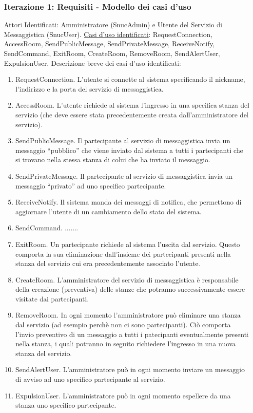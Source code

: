 \documentclass[t]{beamer} %
\let\olditem=\item%
\renewcommand{\item}{\olditem \justifying}%
\begin{document}
\begin{frame} [allowframebreaks]
  \frametitle{Iterazione 1: Requisiti - Modello dei casi d'uso}
   \underline{Attori Identificati}: Amministratore (SnucAdmin) e Utente del Servizio di Messaggistica (SnucUser). \newline
   \underline{Casi d'uso identificati}: RequestConnection, AccessRoom, SendPublicMessage, SendPrivateMessage, ReceiveNotify, SendCommand, ExitRoom, CreateRoom, 
                                        RemoveRoom, SendAlertUser, ExpulsionUser. \newline
   Descrizione breve dei casi d'uso identificati:
   \begin{enumerate} 
    \item RequestConnection. L’utente si connette al sistema specificando il nickname, l’indirizzo e la porta del servizio di messaggistica.
    \item AccessRoom. L’utente richiede al sistema l’ingresso in una specifica stanza del servizio (che deve essere stata precedentemente creata dall’amministratore 
          del servizio). 
    \item SendPublicMessage. Il partecipante al servizio di messaggistica invia un messaggio ``pubblico'' che viene inviato dal sistema a tutti i partecipanti che 
          si trovano nella stessa stanza di colui che ha inviato il messaggio.
    \item SendPrivateMessage. Il partecipante al servizio di messaggistica  invia un messaggio ``privato'' ad uno specifico partecipante.
    \item ReceiveNotify. Il sistema manda dei messaggi di notifica, che permettono di aggiornare l’utente di un cambiamento dello stato del sistema.
    \item SendCommand. .......
    \item ExitRoom. Un partecipante richiede al sistema l’uscita dal servizio. Questo comporta la sua eliminazione dall’insieme dei partecipanti presenti nella 
          stanza del servizio cui era precedentemente associato l’utente.
    \item CreateRoom. L’amministratore del servizio di messaggistica è responsabile della creazione (preventiva) delle stanze che potranno successivamente essere 
          visitate dai partecipanti.
    \item RemoveRoom. In ogni momento l’amministratore può eliminare una stanza dal servizio (ad esempio perchè non ci sono partecipanti). Ciò comporta l’invio 
          preventivo di un messaggio a tutti i patecipanti eventualmente presenti nella stanza, i quali potranno in seguito richiedere l’ingresso in una   
          nuova stanza del servizio.
    \item SendAlertUser. L’amministratore può in ogni momento inviare un messaggio di avviso ad uno specifico partecipante al servizio.
    \item ExpulsionUser. L’amministratore può in ogni momento espellere da una stanza uno specifico partecipante.  
   \end{enumerate}
\end{frame}
\end{document}
